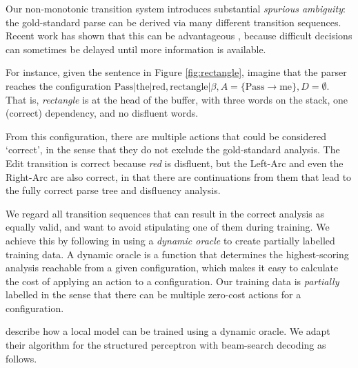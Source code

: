 \documentclass[11pt,letterpaper]{article}
\begin{document}

Our non-monotonic transition system introduces substantial \emph{spurious ambiguity}:
the gold-standard parse can be derived via many different transition sequences.
Recent work has shown that this can be advantageous
\citep{sartorio:13,honnibal:13,goldberg:12}, because difficult decisions can
sometimes be delayed until more information is available.

For instance, given the sentence in Figure \ref{fig:rectangle}, imagine that
the parser reaches the configuration $\mathrm{Pass} | \mathrm{the} | \mathrm{red}, \mathrm{rectangle} | \beta, A = \{ \mathrm{Pass} \rightarrow \mathrm{me} \}, D = \emptyset$. That is, \emph{rectangle}
is at the head of the buffer, with three words on the stack, one (correct) dependency,
and no disfluent words.

From this configuration, there are multiple actions that could be considered
`correct', in the sense that they do not exclude the gold-standard analysis.
The Edit transition is correct because \emph{red} is disfluent, but the
Left-Arc and even the Right-Arc are also correct, in that there are continuations
from them that lead to the fully correct parse tree and disfluency analysis.

We regard all transition sequences that can result in the correct analysis as
equally valid, and want to avoid stipulating one of them during training.  
We achieve this by following \citet{goldberg:12} in using a
\emph{dynamic oracle} to create partially labelled training data. 
A dynamic oracle is a function that determines the highest-scoring analysis reachable
from a given configuration, which makes it easy to calculate the cost of applying
an action to a configuration.  Our training data is \emph{partially} labelled
in the sense that there can be multiple zero-cost actions for a configuration.

\citet{goldberg:12} describe how a local model can be trained using a dynamic
oracle.  We adapt their algorithm for the structured perceptron with beam-search
decoding as follows.
\end{document}
